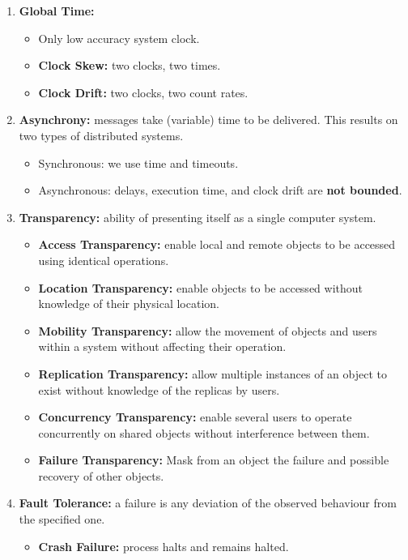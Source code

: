 \begin{enumerate}
    \item \textbf{Global Time:}
    \begin{itemize}
        \item Only low accuracy system clock.
        \item \textbf{Clock Skew:} two clocks, two times.
        \item \textbf{Clock Drift:} two clocks, two count rates.
    \end{itemize}
    \item \textbf{Asynchrony:} messages take (variable) time to be delivered.
        This results on two types of distributed systems.
    \begin{itemize}
        \item Synchronous: we use time and timeouts.
        \item Asynchronous: delays, execution time, and clock drift are \textbf{not bounded}.
    \end{itemize}
    \item \textbf{Transparency:} ability of presenting itself as a single computer system.
    \begin{itemize}
        \item \textbf{Access Transparency:} enable local and remote objects to be accessed using identical operations.
        \item \textbf{Location Transparency:} enable objects to be accessed without knowledge of their physical location.
        \item \textbf{Mobility Transparency:} allow the movement of objects and users within a system without affecting their operation.
        \item \textbf{Replication Transparency:} allow multiple instances of an object to exist without knowledge of the replicas by users.
        \item \textbf{Concurrency Transparency:} enable several users to operate concurrently on shared objects without interference between them.
        \item \textbf{Failure Transparency:} Mask from an object the failure and possible recovery of other objects.
    \end{itemize}
    \item \textbf{Fault Tolerance:} a failure is any deviation of the observed behaviour from the specified one.
    \begin{itemize}
        \item \textbf{Crash Failure:} process halts and remains halted.

\end{itemize}
\end{enumerate}
